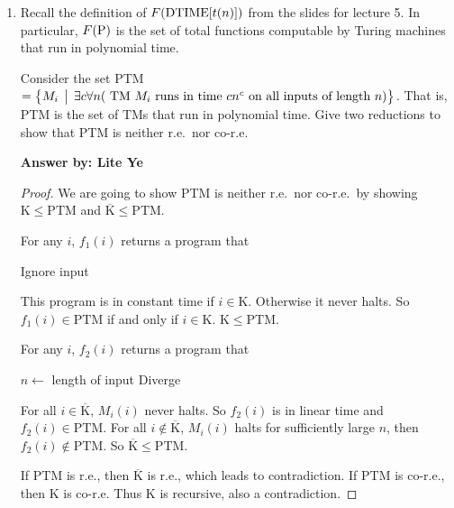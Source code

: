 \documentclass[12pt]{article}
\begin{document}
\noindent{}
\addtocounter{section}{1}

\begin{enumerate}
  \item Recall the definition of $F(\mbox{{\rm DTIME}}[t(n)])$ from the slides for lecture 5.  In particular,
  $F(\mbox{{\rm P}})$ is the set of total functions computable by Turing machines that run in polynomial time.  

Consider the set PTM  
$=\bigl\{ M_i \,\bigm|\, \exists c \forall n(\mbox{ TM $M_i$ runs in time $cn^c$ on all inputs of length $n$}
  ) \bigr\}$. 
That is, PTM is the set of TMs that run in polynomial time.
Give two reductions to show that PTM is neither r.e.\ nor co-r.e.

{\bf Answer by: Lite Ye} 

\begin{proof}
  We are going to show PTM is neither r.e.\ nor co-r.e.\ by showing
  $\mathrm{K}\leq \mathrm{PTM}$ and $\overline{\mathrm{K}}\leq \mathrm{PTM}$.
  
  For any $i$, $f_1(i)$ returns a program that
  \begin{center}
    \begin{algorithmic}
      \STATE Ignore input   \ELSE {}
      \ENDIF
    \end{algorithmic}
  \end{center}
  This program is in constant time if $i\in \mathrm{K}$. Otherwise it never halts. So $f_1(i)\in
  \mathrm{PTM}$ if and only if $i \in \mathrm{K}$. $\mathrm{K}\leq \mathrm{PTM}$.
  
  For any $i$, $f_2(i)$ returns a program that
  \begin{center}
    \begin{algorithmic}
      \STATE $n \gets$ length of input
      \STATE Diverge
      \ELSE
      \ENDIF
    \end{algorithmic}
  \end{center}
  For all $i\in \overline{\mathrm{K}}$, $M_i(i)$ never halts. So $f_2(i)$ is in
  linear time and $f_2(i) \in \mathrm{PTM}$. For all $i\not\in
  \overline{\mathrm{K}}$, $M_i(i)$ halts for sufficiently large $n$, then
  $f_2(i)\not\in \mathrm{PTM}$. So $\overline{\mathrm{K}}\leq \mathrm{PTM}$.

  If $\mathrm{PTM}$ is r.e., then $\overline{\mathrm{K}}$ is r.e., which leads
  to contradiction. If $\mathrm{PTM}$ is co-r.e., then $\mathrm{K}$ is co-r.e.
  Thus $\mathrm{K}$ is recursive, also a contradiction.
\end{proof}




\end{enumerate}
\end{document}
